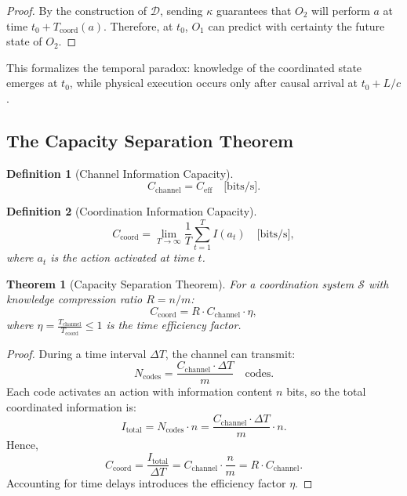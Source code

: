 \documentclass[11pt,a4paper]{article}
\newtheorem{theorem}{Theorem}
\newtheorem{definition}{Definition}
\begin{document}
\begin{proof}
	By the construction of $\mathcal{D}$, sending $\kappa$ guarantees that $O_2$ will perform $a$ at time $t_0 + T_{\text{coord}}(a)$. Therefore, at $t_0$, $O_1$ can predict with certainty the future state of $O_2$.
\end{proof}

This formalizes the temporal paradox: knowledge of the coordinated state emerges at $t_0$, while physical execution occurs only after causal arrival at $t_0 + L/c$.

\subsection{The Capacity Separation Theorem}

\begin{definition}[Channel Information Capacity]
	\[
	C_{\text{channel}} = C_{\text{eff}} \quad \text{[bits/s]}.
	\]
\end{definition}

\begin{definition}[Coordination Information Capacity]
	\[
	C_{\text{coord}} = \lim_{T \to \infty} \frac{1}{T} \sum_{t=1}^{T} I(a_t) \quad \text{[bits/s]},
	\]
	where $a_t$ is the action activated at time $t$.
\end{definition}

\begin{theorem}[Capacity Separation Theorem]
	\label{thm:capacity-separation}
	For a coordination system $\mathcal{S}$ with knowledge compression ratio $R = n/m$:
	\[
	C_{\text{coord}} = R \cdot C_{\text{channel}} \cdot \eta,
	\]
	where $\eta = \frac{T_{\text{channel}}}{T_{\text{coord}}} \leq 1$ is the time efficiency factor.
\end{theorem}

\begin{proof}
	During a time interval $\Delta T$, the channel can transmit:
	\[
	N_{\text{codes}} = \frac{C_{\text{channel}} \cdot \Delta T}{m} \quad \text{codes}.
	\]
	Each code activates an action with information content $n$ bits, so the total coordinated information is:
	\[
	I_{\text{total}} = N_{\text{codes}} \cdot n = \frac{C_{\text{channel}} \cdot \Delta T}{m} \cdot n.
	\]
	Hence,
	\[
	C_{\text{coord}} = \frac{I_{\text{total}}}{\Delta T} = C_{\text{channel}} \cdot \frac{n}{m} = R \cdot C_{\text{channel}}.
	\]
	Accounting for time delays introduces the efficiency factor $\eta$.
\end{proof}
\end{document}
